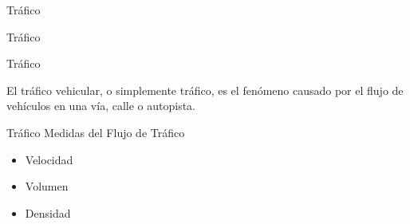 \begin{frame}[c]{Tráfico}
	\begin{center}
		\huge{Tráfico}
    \end{center}
\end{frame}

\begin{frame}[c]{Tráfico}
	\begin{center}
		\large{El tráfico vehicular, o simplemente tráfico, es el fenómeno causado por el flujo de vehículos en una vía, calle o autopista.}
	\end{center}
\end{frame}

\begin{frame}[c]{Tráfico}
	\large{Medidas del Flujo de Tráfico}
	\vspace{\baselineskip}
	\begin{center}
		\begin{itemize}	 	
			\item Velocidad
			\vspace{\baselineskip}
			\item Volumen
			\vspace{\baselineskip}
			\item Densidad
		\end{itemize}			
	\end{center}
\end{frame}
